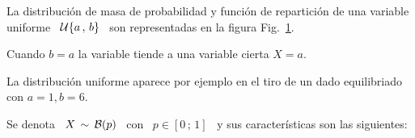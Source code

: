 La distribuci\'on  de masa de probabilidad  y funci\'on de  repartici\'on de una
variable uniforme  \ $\mathcal{U}\{  a \, ,  \, b  \}$ \ son  representadas en  la figura
Fig.~\ref{Fig:MP:UniformeDiscreta}.
%
\begin{figure}[h!]
\begin{center}  \end{center}
% 
\label{Fig:MP:UniformeDiscreta}
\end{figure}

Cuando $b = a$ la variable tiende a una variable cierta $X = a$.

La  distribuci\'on  uniforme  aparece  por   ejemplo  en  el  tiro  de  un  dado
equilibriado con $a = 1, b = 6$.



\label{Sssec:MP:Bernoulli}

Se  denota \  $X \,  \sim \,  \mathcal{B}(p)$ \  con \  $p \in  [0 \,  ; \,  1]$ \  y sus
caracter\'isticas son las siguientes:

